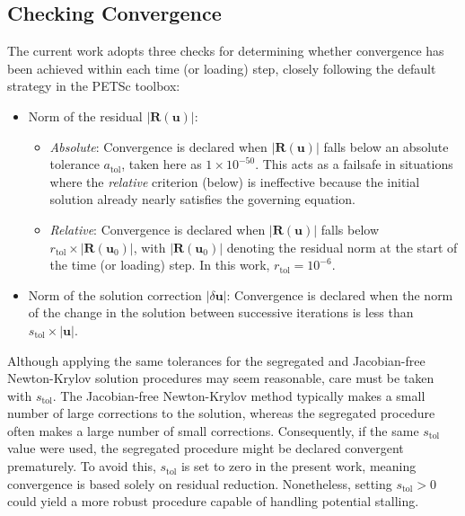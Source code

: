 \documentclass[sn-mathphys,Numbered]{sn-jnl}%
\newcommand{\bb}{\boldsymbol}
\begin{document}
\subsection{Checking Convergence}
The current work adopts three checks for determining whether convergence has been achieved within each time (or loading) step, closely following the default strategy in the PETSc toolbox:
\begin{itemize}
    \item Norm of the residual $|\bb{R}(\bb{u})|$:
    \begin{itemize}
        \item \emph{Absolute}: Convergence is declared when $|\bb{R}(\bb{u})|$ falls below an absolute tolerance $a_{\text{tol}}$, taken here as $1\times 10^{-50}$. This acts as a failsafe in situations where the \emph{relative} criterion (below) is ineffective because the initial solution already nearly satisfies the governing equation.
        \item \emph{Relative}: Convergence is declared when $|\bb{R}(\bb{u})|$ falls below $r_{\text{tol}} \times |\bb{R}(\bb{u}_0)|$, with $|\bb{R}(\bb{u}_0)|$ denoting the residual norm at the start of the time (or loading) step. In this work, $r_{\text{tol}} = 10^{-6}$.
    \end{itemize}
    \item Norm of the solution correction $|\delta \bb{u}|$: Convergence is declared when the norm of the change in the solution between successive iterations is less than $s_{\text{tol}} \times |\bb{u}|$.
\end{itemize}

Although applying the same tolerances for the segregated and Jacobian-free Newton-Krylov solution procedures may seem reasonable, care must be taken with $s_{\text{tol}}$. The Jacobian-free Newton-Krylov method typically makes a small number of large corrections to the solution, whereas the segregated procedure often makes a large number of small corrections. Consequently, if the same $s_{\text{tol}}$ value were used, the segregated procedure might be declared convergent prematurely. To avoid this, $s_{\text{tol}}$ is set to zero in the present work, meaning convergence is based solely on residual reduction. Nonetheless, setting $s_{\text{tol}} > 0$ could yield a more robust procedure capable of handling potential stalling.


\end{document}
